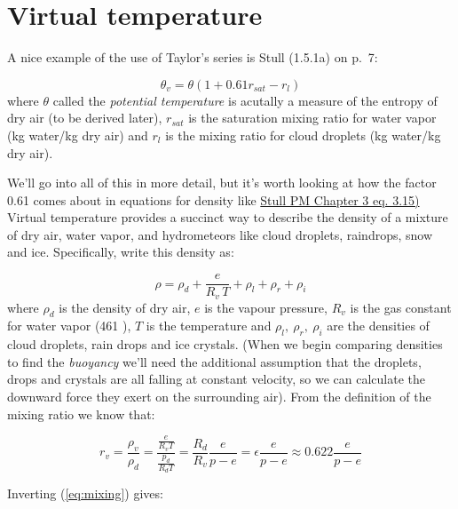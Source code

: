 \documentclass[12pt]{article}
\begin{document}
\pagestyle{first}


\section{Virtual temperature}
\label{sec:virtual-temperature}

A nice example of the use of Taylor's series is Stull (1.5.1a) on p.~7:

\begin{equation*}
  \theta_v = \theta ( 1 + 0.61 r_{sat} - r_l )
\end{equation*}
where $\theta$ called the \textit{potential temperature} is acutally a measure
of the entropy of dry air (to be derived later), $r_{sat}$ is the saturation
mixing ratio for water vapor (kg water/kg dry air) and $r_l$ is the
mixing ratio for cloud droplets (kg water/kg dry air).

We'll go into all of this in more detail, but it's worth looking at how
the factor 0.61 comes about in equations for density like 
\href{https://www.eoas.ubc.ca/books/Practical_Meteorology/prmet102/Ch03-thermo-v102b.pdf}%
{Stull PM Chapter 3 eq. 3.15)}
Virtual temperature provides a succinct way to describe the density of a mixture of
dry air, water vapor, and hydrometeors like cloud droplets, raindrops, snow and ice.
Specifically, write this density as:

  \begin{equation}
    \label{eq:dalton}
    \rho = \rho_d + \frac{e}{R_v\, T} + \rho_l + \rho_r + \rho_i
  \end{equation}
where $\rho_d$ is the density of dry air, $e$ is the vapour pressure, $R_v$ is the
gas constant for water vapor (461 \jkgk), $T$ is the temperature and
$\rho_l,\  \rho_r,\ \rho_i$ are the densities of cloud droplets, rain drops and ice
crystals.  (When we begin comparing densities to find the \textit{buoyancy} we'll
need the additional assumption that the droplets, drops and crystals are all
falling at constant velocity, so we can calculate the downward force they exert
on the surrounding air). From the definition of the mixing ratio we know that:

\begin{equation}
  \label{eq:mixing}
  r_v = \frac{\rho_v}{\rho_d} = \frac{\frac{e}{R_v T}}{\frac{p_d}{R_d T}} = \frac{R_d}{R_v} \frac{e}{p-e}
      = \epsilon \frac{e}{p-e} \approx 0.622 \frac{e}{p-e}
\end{equation}

Inverting (\ref{eq:mixing}) gives:
\end{document}
